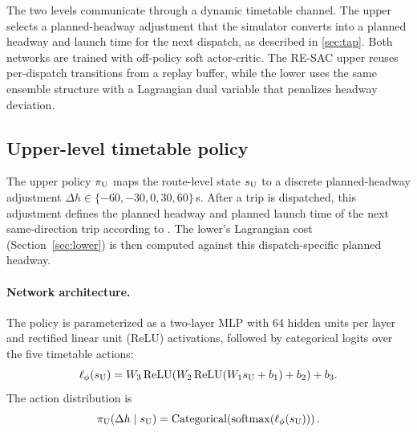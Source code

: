 The two levels communicate through a dynamic timetable channel. The upper selects a planned-headway adjustment that the simulator converts into a planned headway and launch time for the next dispatch, as described in \cref{sec:tap}.
Both networks are trained with off-policy soft actor-critic. The RE-SAC upper reuses per-dispatch transitions from a replay buffer, while the lower uses the same ensemble structure with a Lagrangian dual variable that penalizes headway deviation.

\subsection{Upper-level timetable policy}
\label{sec:upper}

The upper policy $\pi_{\mathrm{U}}$ maps the route-level state $s_{\mathrm{U}}$ to a discrete planned-headway adjustment $\Delta h \in \{-60,-30,0,30,60\}$\,s.
After a trip is dispatched, this adjustment defines the planned headway and planned launch time of the next same-direction trip according to .
The lower's Lagrangian cost (Section~\ref{sec:lower}) is then computed against this dispatch-specific planned headway.

\paragraph{Network architecture.}
The policy is parameterized as a two-layer MLP with 64 hidden units per layer and rectified linear unit (ReLU) activations, followed by categorical logits over the five timetable actions:
\begin{equation}
\label{eq:upper_net}
    \ell_{\phi}(s_{\mathrm{U}}) = W_3 \, \mathrm{ReLU}(W_2 \, \mathrm{ReLU}(W_1 s_{\mathrm{U}} + b_1) + b_2) + b_3 .
\end{equation}
The action distribution is
\begin{equation}
\label{eq:upper_action_method}
    \pi_{\mathrm{U}}(\Delta h \mid s_{\mathrm{U}}) =
    \mathrm{Categorical}\!\left(\mathrm{softmax}(\ell_{\phi}(s_{\mathrm{U}}))\right).
\end{equation}

